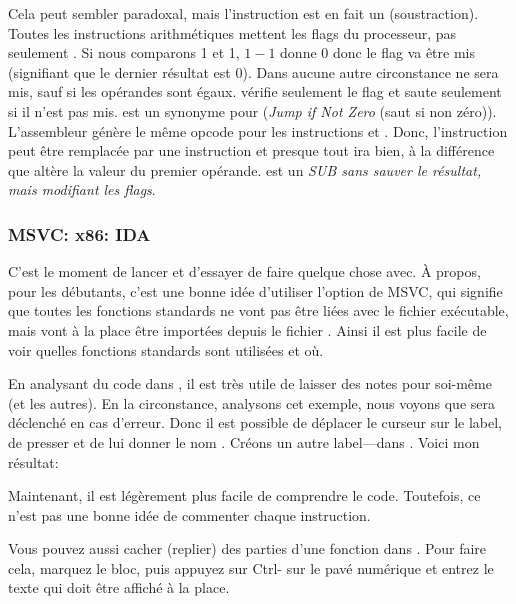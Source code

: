 \label{CMPandSUB} 
Cela peut sembler paradoxal, mais l'instruction \CMP est en fait un \SUB (soustraction).
Toutes les instructions arithmétiques mettent les flags du processeur, pas seulement \CMP.
Si nous comparons 1 et 1, $1-1$ donne 0 donc le flag \ZF va être mis (signifiant
que le dernier résultat est 0).
Dans aucune autre circonstance \ZF ne sera mis, sauf si les opérandes sont égaux.
\JNE vérifie seulement le flag \ZF et saute seulement si il n'est pas mis. \JNE
est un synonyme pour \JNZ (\emph{Jump if Not Zero} (saut si non zéro)).
L'assembleur génère le même opcode pour les instructions \JNE et \JNZ.
Donc, l'instruction \CMP peut être remplacée par une instruction \SUB et presque
tout ira bien, à la différence que \SUB altère la valeur du premier opérande.
\CMP est un \emph{SUB sans sauver le résultat, mais modifiant les flags}.

\subsubsection{MSVC: x86: IDA}

C'est le moment de lancer \IDA et d'essayer de faire quelque chose avec.
À propos, pour les débutants, c'est une bonne idée d'utiliser l'option 
de MSVC, qui signifie que toutes les fonctions standards ne vont pas être liées
avec le fichier exécutable, mais vont à la place être importées depuis le fichier
.
Ainsi il est plus facile de voir quelles fonctions standards sont utilisées et où.

En analysant du code dans \IDA, il est très utile de laisser des notes pour soi-même
(et les autres).
En la circonstance, analysons cet exemple, nous voyons que  sera déclenché
en cas d'erreur.
Donc il est possible de déplacer le curseur sur le label, de presser  et de
lui donner le nom .
Créons un autre label---dans .
Voici mon résultat:



Maintenant, il est légèrement plus facile de comprendre le code.
Toutefois, ce n'est pas une bonne idée de commenter chaque instruction.

Vous pouvez aussi cacher (replier) des parties d'une fonction dans \IDA.
Pour faire cela, marquez le bloc, puis appuyez sur Ctrl-\q{--} sur le pavé numérique et
entrez le texte qui doit être affiché à la place.

